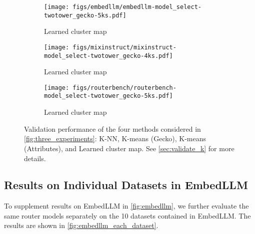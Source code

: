 \begin{figure*}[th]
\begin{minipage}[b]{.98\linewidth}
    \begin{subfigure}{0.32\textwidth}
        \texttt{[image: figs/embedllm/embedllm-model\_select-twotower\_gecko-5ks.pdf]}
        \caption{Learned cluster map}
    \end{subfigure}
    \begin{subfigure}{0.32\textwidth}
        \texttt{[image: figs/mixinstruct/mixinstruct-model\_select-twotower\_gecko-4ks.pdf]}
        \caption{Learned cluster map}
    \end{subfigure}
    \begin{subfigure}{0.32\textwidth}
        \texttt{[image: figs/routerbench/routerbench-model\_select-twotower\_gecko-5ks.pdf]}
        \caption{Learned cluster map}
    \end{subfigure}
  \end{minipage}
  \caption{Validation performance of the four methods considered in \cref{fig:three_experiments}: K-NN, K-means (Gecko), K-means (Attributes), and Learned cluster map. See \cref{sec:validate_k} for more details.
  }
  \label{fig:validate_k}
\end{figure*}


\clearpage
\newpage
\subsection{Results on Individual Datasets in EmbedLLM}
To supplement results on EmbedLLM in \cref{fig:embedllm}, 
we further evaluate  the same router models separately on the 10 datasets contained in EmbedLLM. 
The results are shown in \cref{fig:embedllm_each_dataset}.

